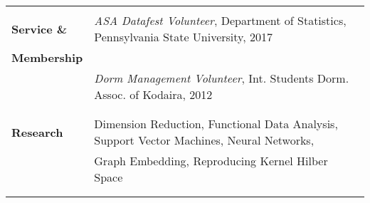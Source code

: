 \documentclass[utf8,letterpaper,oneside]{article}
\begin{document}
\begin{center}
\begin{tabular}{l l}
                         &                                                                                                       \\
  \textbf{Service \& }   &                                                                                                       
  \textit{ASA Datafest Volunteer}, Department of Statistics, Pennsylvania State University, 2017                                 \\
  \textbf{Membership}    &                                                                                                       \\
                         & \textit{Dorm Management Volunteer}, Int. Students Dorm. Assoc. of Kodaira, 2012                       \\
                         &                                                                                                       \\ \hline
                         &                                                                                                       \\
  \textbf{Research}      & Dimension Reduction, Functional Data Analysis, Support Vector Machines, Neural Networks,              \\
                         & Graph Embedding, Reproducing Kernel Hilber Space                                                      \\
                         &                                                                                                       \\ \hline
                         &                                                                                                       \\

\end{tabular}
\end{center}
\end{document}
